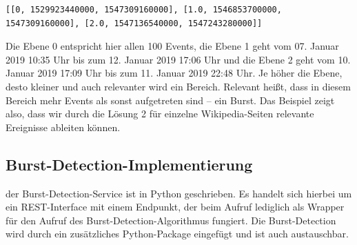 \begin{lstlisting}[label=Solution2_Layers,caption={Ebene 0, 1 und 2 der Burst-Detection},language=epl,firstnumber=1,captionpos=b]
[[0, 1529923440000, 1547309160000], [1.0, 1546853700000, 1547309160000], [2.0, 1547136540000, 1547243280000]]
\end{lstlisting}

Die Ebene 0 entspricht hier allen 100 Events, die Ebene 1 geht vom 07. Januar 2019 10:35 Uhr bis zum 12. Januar 2019 17:06 Uhr und die
Ebene 2 geht vom 10. Januar 2019 17:09 Uhr bis zum 11. Januar 2019 22:48 Uhr. Je höher die Ebene, desto kleiner und auch
relevanter wird ein Bereich. Relevant heißt, dass in diesem Bereich mehr Events als sonst aufgetreten sind -- ein Burst.
Das Beispiel zeigt also, dass wir durch die Lösung 2 für einzelne Wikipedia-Seiten relevante Ereignisse ableiten können.

\subsection{Burst-Detection-Implementierung}
der Burst-Detection-Service ist in Python geschrieben. Es handelt sich hierbei um ein REST-Interface mit einem Endpunkt,
der beim Aufruf lediglich als Wrapper für den Aufruf des Burst-Detection-Algorithmus fungiert. Die Burst-Detection wird durch ein
zusätzliches Python-Package eingefügt und ist auch austauschbar.
